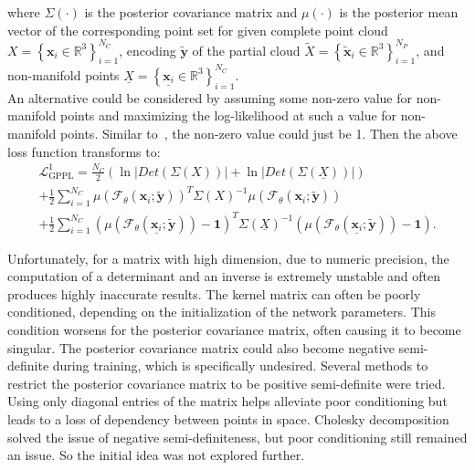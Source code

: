             where $\Sigma(\cdot)$ is the posterior covariance matrix and $\mu(\cdot)$ is the posterior mean vector of the corresponding point set for given complete point cloud $X=\left\{\mathbf{x}_{i} \in \mathbb{R}^{3}\right\}_{i=1}^{N_C}$, encoding $\mathbf{\tilde{y}}$ of the partial cloud $\tilde{X}=\left\{\mathbf{\tilde{x}}_{i} \in \mathbb{R}^{3}\right\}_{i=1}^{N_P}$, and non-manifold points $\underline{X}=\left\{\underline{\mathbf{x}_i} \in \mathbb{R}^{3}\right\}_{i=1}^{N_C}$.
            \\
            An alternative could be considered by assuming some non-zero value for non-manifold points and maximizing the log-likelihood at such a value for non-manifold points. Similar to~\cite{GPIS}, the non-zero value could just be 1. Then the above loss function transforms to:
             \begin{equation}\label{GPLLLoss2}
                \begin{aligned}
                    \mathcal{L}^1_{\text{GPPL}} = \frac{N_C}{2}(\ln |Det(\Sigma(X))| + \ln |Det(\Sigma(\underline{X}))|)
                    \\
                    + \frac{1}{2}\sum_{i=1}^{N_C} \mu \left(\mathcal{F}_\theta(\mathbf{x}_i; \mathbf{\tilde{y}})\right)^T \Sigma(X)^{-1} \mu\left(\mathcal{F}_\theta(\mathbf{x}_i; \mathbf{\tilde{y}})\right)
                    \\
                    + \frac{1}{2}\sum_{i=1}^{N_C}\left( \mu \left(\mathcal{F}_\theta(\underline{\mathbf{x}_i}; \mathbf{\tilde{y}})\right) - \mathbf{1}\right)^T \Sigma(\underline{X})^{-1} \left( \mu \left(\mathcal{F}_\theta(\underline{\mathbf{x}_i}; \mathbf{\tilde{y}})\right) - \mathbf{1}\right).
                \end{aligned}
            \end{equation}
            \newline
            
            Unfortunately, for a matrix with high dimension, due to numeric precision, the computation of a determinant and an inverse is extremely unstable and often produces highly inaccurate results. The kernel matrix can often be poorly conditioned, depending on the initialization of the network parameters. This condition worsens for the posterior covariance matrix, often causing it to become singular. The posterior covariance matrix could also become negative semi-definite during training, which is specifically undesired. Several methods to restrict the posterior covariance matrix to be positive semi-definite were tried. Using only diagonal entries of the matrix helps alleviate poor conditioning but leads to a loss of dependency between points in space. Cholesky decomposition solved the issue of negative semi-definiteness, but poor conditioning still remained an issue. So the initial idea was not explored further.
            \newline

